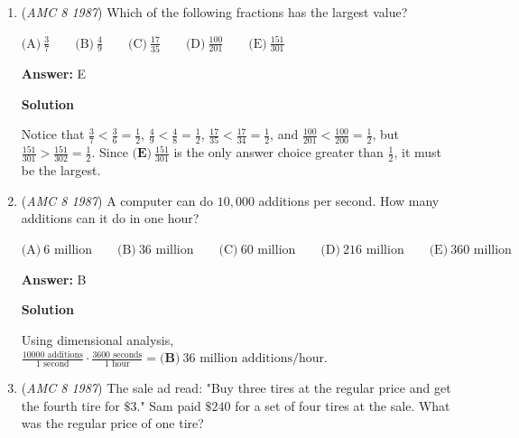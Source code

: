 \begin{enumerate}
 



\textbf{Solution 2}

The total area of the rectangle is $12 \cdot 18 = 216$.  The $x$-coordinate of the left edge of the shaded area is $\frac{4}{6} = \frac{2}{3}$ of the way from $9$ to $18$, which is $9 + \frac{2}{3} \cdot 9 = 15$.  Therefore, the shaded area is $6 \cdot 3 = 18$.  Therefore, $\frac{18}{216} = \boxed{\textbf{(C)}\ \frac{1}{12}}$ of the entire rectangle is shaded.

 


	\item (\textit{AMC 8 1987}) Which of the following fractions has the largest value?


 $\text{(A)}\ \frac{3}{7} \qquad \text{(B)}\ \frac{4}{9} \qquad \text{(C)}\ \frac{17}{35} \qquad \text{(D)}\ \frac{100}{201} \qquad \text{(E)}\ \frac{151}{301}$

 \textbf{Answer: }E



\textbf{Solution}

Notice that $\frac{3}{7} < \frac{3}{6} = \frac{1}{2}$, $\frac{4}{9} < \frac{4}{8} = \frac{1}{2}$, $\frac{17}{35} < \frac{17}{34} = \frac{1}{2}$, and $\frac{100}{201} < \frac{100}{200} = \frac{1}{2}$, but $\frac{151}{301} > \frac{151}{302} = \frac{1}{2}$.  Since $\boxed{\textbf{(E)}\ \frac{151}{301}}$ is the only answer choice greater than $\frac{1}{2}$, it must be the largest.

 


	\item (\textit{AMC 8 1987}) A computer can do $10,000$ additions per second.  How many additions can it do in one hour?


 $\text{(A)}\ 6\text{ million} \qquad \text{(B)}\ 36\text{ million} \qquad \text{(C)}\ 60\text{ million} \qquad \text{(D)}\ 216\text{ million} \qquad \text{(E)}\ 360\text{ million}$

 \textbf{Answer: }B



\textbf{Solution}

Using dimensional analysis, ${\frac{10000\text{ additions}}{1\text{ second}} \cdot \frac{3600\text{ seconds}}{1\text{ hour}} = \boxed{\textbf{(B)}\ 36 \text{ million}}\text{ additions/hour}}$.

 


	\item (\textit{AMC 8 1987}) The sale ad read: "Buy three tires at the regular price and get the fourth tire for $\$3.$" Sam paid $\$240$ for a set of four tires at the sale.  What was the regular price of one tire?



\end{enumerate}
